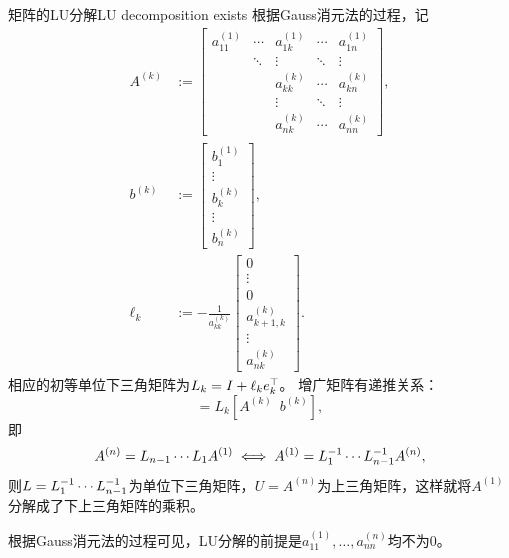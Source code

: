 \begin{theorem}
    {矩阵的LU分解}{LU decomposition exists}
    根据Gauss消元法的过程，记
    \begin{align*}
        A^{(k)} &:= \begin{bmatrix}
            a_{11}^{(1)}&\cdots&a_{1k}^{(1)}&\cdots&a_{1n}^{(1)}\\
            &\ddots&\vdots&\ddots&\vdots\\
            &&a_{kk}^{(k)}&\cdots&a_{kn}^{(k)}\\
            &&\vdots&\ddots&\vdots\\
            &&a_{nk}^{(k)}&\cdots&a_{nn}^{(k)}
        \end{bmatrix},\\
        b^{(k)} &:= \begin{bmatrix}
            b_1^{(1)}\\\vdots\\b_k^{(k)}\\\vdots\\b_n^{(k)}
        \end{bmatrix},\\
        \ell_k &:= -\frac1{a_{kk}^{(k)}}\begin{bmatrix}
            0\\\vdots\\0\\a_{k+1,k}^{(k)}\\\vdots\\a_{nk}^{(k)}
        \end{bmatrix}.
    \end{align*}
    相应的初等单位下三角矩阵为$L_k = I + \ell_ke_k^\top$。
    增广矩阵有递推关系：
    \begin{equation}
        [A^{(k+1)}\enspace b^{(k+1)}] = L_k[A^{(k)}\enspace b^{(k)}],
    \end{equation}
    即
    \[
        A^{(n)} = L_{n-1}\cdots L_1A^{(1)} \iff A^{(1)} = L_1^{-1}\cdots L_{n-1}^{-1} A^{(n)},
    \]
    则$L = L_1^{-1}\cdots L_{n-1}^{-1}$为单位下三角矩阵，$U = A^{(n)}$为上三角矩阵，这样就将$A^{(1)}$分解成了下上三角矩阵的乘积。
\end{theorem}

\begin{remark}
    根据Gauss消元法的过程可见，LU分解的前提是$a_{11}^{(1)},\ldots,a_{nn}^{(n)}$均不为0。
\end{remark}

